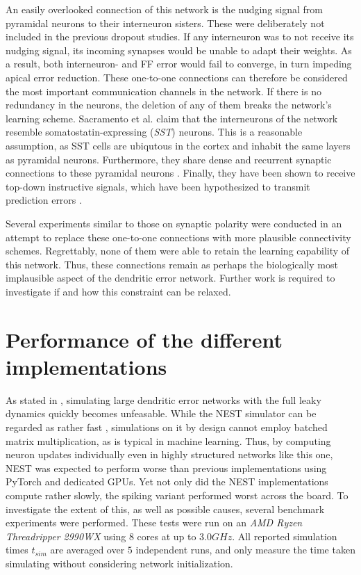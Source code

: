 An easily overlooked connection of this network is the nudging signal from pyramidal neurons to their interneuron
sisters. These were deliberately not included in the previous dropout studies. If any interneuron was to not receive its
nudging signal, its incoming synapses would be unable to adapt their weights. As a result, both interneuron- and FF
error would fail to converge, in turn impeding apical error reduction. These one-to-one connections can  therefore be
considered the most important communication channels in the network. If there is no redundancy in the neurons, the
deletion of any of them breaks the network's learning scheme. Sacramento et al. claim that the interneurons of the
network resemble somatostatin-expressing (\textit{SST}) neurons. This is a reasonable assumption, as SST cells are
ubiqutous in the cortex and inhabit the same layers as pyramidal neurons. Furthermore, they share dense and recurrent
synaptic connections to these pyramidal neurons \citep{urban2016somatostatin}. Finally, they have been shown to receive
top-down instructive signals, which have been hypothesized to transmit prediction errors \citep{Leinweber2017}.

Several experiments similar to those on synaptic polarity were conducted in an attempt to replace these one-to-one
connections with more plausible connectivity schemes. Regrettably, none of them were able to retain the learning
capability of this network. Thus, these connections remain as perhaps the biologically most implausible aspect of the
dendritic error network. Further work is required to investigate if and how this constraint can be relaxed.



\section{Performance of the different implementations}\label{sec-benchmark}

As stated in \citep{Haider2021}, simulating large dendritic error networks with the full leaky dynamics quickly becomes
unfeasable. While the NEST simulator can be regarded as rather fast \citep{albada2018performance}, simulations on it by
design cannot employ batched matrix multiplication, as is typical in machine learning. Thus, by computing neuron updates
individually even in highly structured networks like this one, NEST was expected to perform worse than previous
implementations using PyTorch and dedicated GPUs. Yet not only did the NEST implementations compute rather slowly, the
spiking variant performed worst across the board. To investigate the extent of this, as well as possible causes, several
benchmark experiments were performed. These tests were run on an \textit{AMD Ryzen Threadripper 2990WX} using 8 cores at
up to $3.0GHz$. All reported simulation times $t_{sim}$ are averaged over $5$ independent runs, and only measure the
time taken simulating without considering network initialization. \newline


